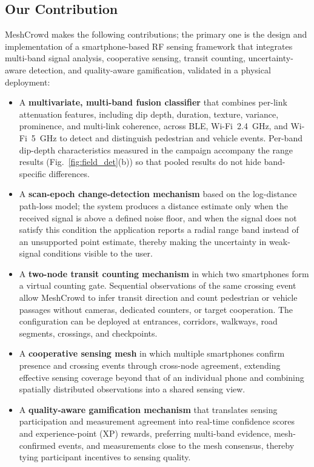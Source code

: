 \documentclass[journal,10pt]{IEEEtran}
\begin{document}
\subsection{Our Contribution}
MeshCrowd makes the following contributions; the primary one is the
design and implementation of a smartphone-based RF sensing framework that
integrates multi-band signal analysis, cooperative sensing, transit
counting, uncertainty-aware detection, and quality-aware gamification,
validated in a physical deployment:

\begin{itemize}
\item A \textbf{multivariate, multi-band fusion classifier} that combines
per-link attenuation features, including dip depth, duration, texture,
variance, prominence, and multi-link coherence, across BLE, Wi-Fi~2.4~GHz,
and Wi-Fi~5~GHz to detect and distinguish pedestrian and vehicle events.
Per-band dip-depth characteristics measured in the campaign accompany the
range results (Fig.~\ref{fig:field_det}(b)) so that pooled results do not hide
band-specific differences.

\item A \textbf{scan-epoch change-detection mechanism} based on the
log-distance path-loss model; the system produces a distance estimate only
when the received signal is above a defined noise floor, and when the
signal does not satisfy this condition the application reports a radial
range band instead of an unsupported point estimate, thereby making the
uncertainty in weak-signal conditions visible to the user.

\item A \textbf{two-node transit counting mechanism} in which two
smartphones form a virtual counting gate. Sequential observations of the
same crossing event allow MeshCrowd to infer transit direction and count
pedestrian or vehicle passages without cameras, dedicated counters, or
target cooperation. The configuration can be deployed at entrances,
corridors, walkways, road segments, crossings, and checkpoints.

\item A \textbf{cooperative sensing mesh} in which multiple smartphones
confirm presence and crossing events through cross-node agreement,
extending effective sensing coverage beyond that of an individual phone and
combining spatially distributed observations into a shared sensing view.

\item A \textbf{quality-aware gamification mechanism} that translates
sensing participation and measurement agreement into real-time confidence
scores and experience-point (XP) rewards, preferring multi-band evidence,
mesh-confirmed events, and measurements close to the mesh consensus,
thereby tying participant incentives to sensing quality.


\end{itemize}
\end{document}
